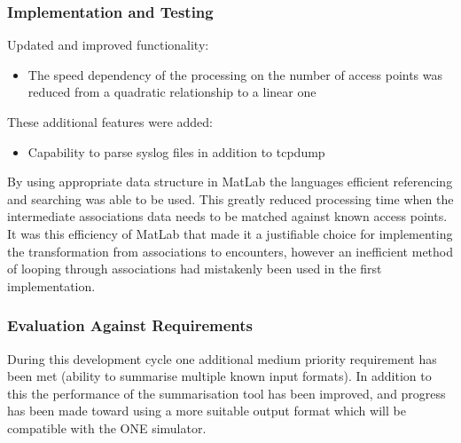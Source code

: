     \subsubsection{Implementation and Testing}
    Updated and improved functionality:
    \begin{itemize}
        \item The speed dependency of the processing on the number of access points was reduced from a quadratic relationship to a linear one
    \end{itemize}
    These additional features were added:
    \begin{itemize}
        \item Capability to parse syslog files in addition to tcpdump
    \end{itemize}
    By using appropriate data structure in MatLab the languages efficient referencing and searching was able to be used. This greatly reduced processing time when the intermediate associations data needs to be matched against known access points. It was this efficiency of MatLab that made it a justifiable choice for implementing the transformation from associations to encounters, however an inefficient method of looping through associations had mistakenly been used in the first implementation.
    \subsubsection{Evaluation Against Requirements}
    During this development cycle one additional medium priority requirement has been met (ability to summarise multiple known input formats). In addition to this the performance of the summarisation tool has been improved, and progress has been made toward using a more suitable output format which will be compatible with the ONE simulator.
    


